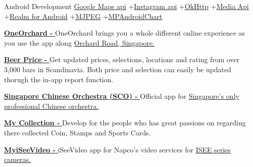 \begin{projectentries}
    \projectentry 
    {Android Development} 
    {{\href{https://developers.google.com/maps/documentation/android-sdk/start}{Google Maps api}}
    +{\href{https://www.instagram.com/developer/}{Instagram api}}
    +{\href{http://square.github.io/okhttp/}{OkHttp}}
    +{\href{https://developer.android.com/guide/topics/media/}{Media Api}}
    +{\href{https://realm.io/docs/java/latest/}{Realm for Android}}
    +{\href{https://en.wikipedia.org/wiki/Motion_JPEG}{MJPEG}}
    +{\href{https://github.com/PhilJay/MPAndroidChart}{MPAndroidChart}}}
    {
      \begin{projectitems} %
        \item {{\href{https://play.google.com/store/apps/details?id=com.orba.OneOrchard}{\textbf{OneOrchard - }}}
        OneOrchard brings you a whole different online experience as you use the app along 
        {\href{http://www.orchardroad.org/}{Orchard Road, Singapore.}}}
        \item {{\href{https://annanovas.com/portfolio/beer-prices-android/}{\textbf{Beer Price - }}}
        Get updated prices, selections, locations and rating from over 3,000 bars in Scandinavia. Both price and selection can easily be 
        updated thorugh the in-app report function.}  
        \item {{\href{https://play.google.com/store/apps/details?id=com.SingaporeChineseOrchestra.SCO}{\textbf{Singapore Chinese Orchestra (SCO) - }}}
        Official app for 
        {\href{https://www.sco.com.sg}{Singapore’s only professional Chinese orchestra.}}}  
        \item {{\href{https://annanovas.com/portfolio/my-collection/}{\textbf{My Collection - }}}
        Develop for the people who has great passions on regarding there collected Coin, Stamps and Sports Cards.}  
        \item {{\href{https://play.google.com/store/apps/details?id=com.napco.uidealer.myiseevideo}{\textbf{MyiSeeVideo - }}}
        iSeeVideo app for Napco's video services for 
        {\href{http://www.napcosecurity.com/products/isee-ivr250/}{ISEE series cameras.}}}  

\end{projectitems}}
\end{projectentries}

